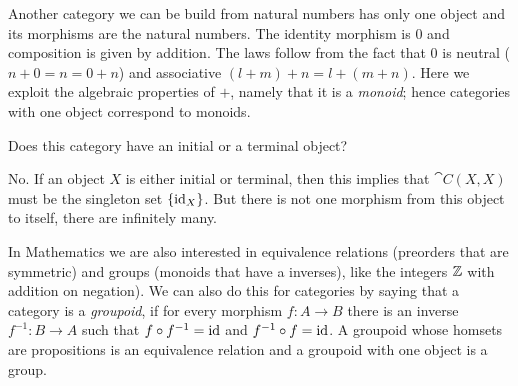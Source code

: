 Another category we can be build from natural numbers has only one object and its morphisms are the natural numbers. The identity morphism is $0$ and composition is given by addition. The laws follow from the fact that $0$ is neutral ($n+0 = n = 0+n$) and associative $(l+m)+n = l+(m+n)$. Here we exploit the algebraic properties of $+$, namely that it is a \emph{monoid}; hence categories with one object correspond to monoids.

\begin{Exercise}
  Does this category have an initial or a terminal object? 
\end{Exercise}
\begin{Answer}
  No. If an object $X$ is either initial or terminal, then this implies that $\cat{C}(X,X)$ must be the singleton set $\{\mathrm{id}_X\}$. But there is not one morphism from this object to itself, there are infinitely many.
\end{Answer}

In Mathematics we are also interested in equivalence relations (preorders that are symmetric) and groups (monoids that have a inverses), like the integers $\mathbb{Z}$ with addition on negation). We can also do this for categories by saying that a category is a \emph{groupoid}, if for every morphism $f : A \to B$ there is an inverse $f^{-1} : B \to A$ such that $f \circ f^{-1} = \mathrm{id}$ and $f^{-1} \circ f = \mathrm{id}$. A groupoid whose homsets are propositions is an equivalence relation and a groupoid with one object is a group.

